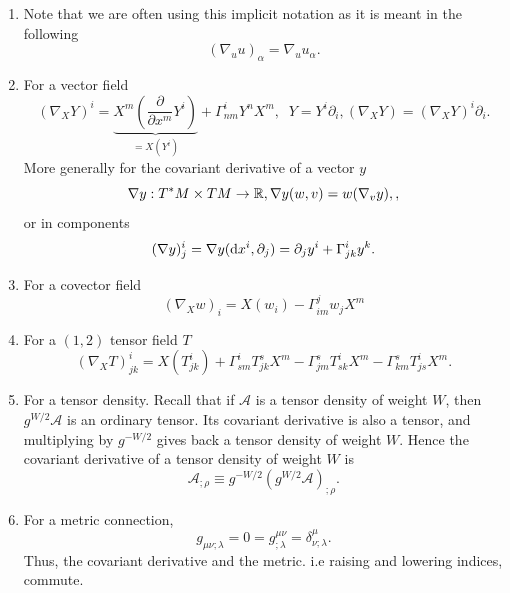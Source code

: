 \begin{enumerate}
	\item Note that we are often using this implicit notation as it is meant in the following
	\begin{equation}
		(\nabla_u u)_\alpha = \nabla_u u_\alpha.
	\end{equation}
	\item For a vector field 
	\begin{equation}
		(\nabla_X Y)^i = \underbrace{X^m\left(\frac{\partial}{\partial x^m} Y^i \right)}_{=X(Y^i)} + \Gamma^i_{nm} Y^n X^m, \;\; Y=Y^i \partial_i, (\nabla_X Y)= (\nabla_X Y)^i \partial_i.
	\end{equation}
	More generally for the covariant derivative of a vector $y$
	\begin{equation}
		\nabla y:T^*M \times TM \rightarrow \mathbb{R}, \nabla y(w,v) = w(\nabla_v y),,
	\end{equation}
	or in components
	\begin{equation}
		( \nabla y)^i_j = \nabla y (\mathrm{d} x^i, \partial_j)= \partial_j y^i + \Gamma^i_{jk} y^k.
	\end{equation}
	\item For a covector field
	\begin{equation}
		(\nabla_X w)_i = X(w_i) - \Gamma^j_{i m} w_j X^m
	\end{equation}
	\item For a $(1,2)$ tensor field $T$
	\begin{equation}
		(\nabla_X T)^i_{jk} = X(T^i_{jk}) + \Gamma^i_{sm} T^s_{jk}X^m - \Gamma^s_{jm} T^i_{sk} X^m - \Gamma^s_{km} T^i_{js} X^m.
	\end{equation}
	\item For a tensor density. Recall that if $\mathcal{A}$ is a tensor density of weight $W$, then $g^{W/2} \mathcal{A}$ is an ordinary tensor. Its covariant derivative is also a tensor, and multiplying by $g^{-W/2}$ gives back a tensor density of weight $W$. Hence the covariant derivative of a tensor density of weight $W$ is 
	\begin{equation}
		\mathcal{A}_{;\rho} \equiv g^{-W/2 } (g^{W/2} \mathcal{A})_{;\rho}.
	\end{equation}
	\item For a metric connection, 
	\begin{equation}
		g_{\mu \nu;\lambda} = 0 = g^{\mu \nu}_{;\lambda} = \delta^\mu_{\nu ; \lambda}.
	\end{equation}
	Thus, the covariant derivative and the metric. i.e raising and lowering indices, commute.
\end{enumerate}
